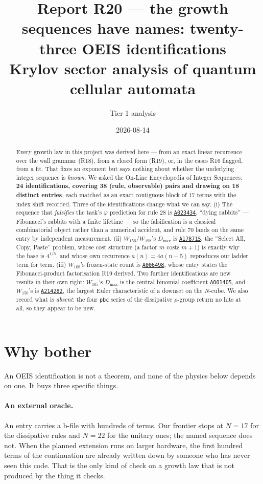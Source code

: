 \documentclass[11pt]{article}
\title{\textbf{Report R20 --- the growth sequences have names:
twenty-three OEIS identifications}\\
\large Krylov sector analysis of quantum cellular automata}
\author{Tier 1 analysis}
\date{2026-08-14}
\newcommand{\rt}[1]{\texttt{#1}}
\newcommand{\oeis}[1]{\href{https://oeis.org/#1}{\texttt{#1}}}
\theoremstyle{plain}
\begin{document}
\maketitle

\begin{abstract}
Every growth law in this project was derived here --- from an exact linear
recurrence over the wall grammar (R18), from a closed form (R19), or, in the
cases R16 flagged, from a fit. That fixes an exponent but says nothing about
whether the underlying integer sequence is \emph{known}. We asked the On-Line
Encyclopedia of Integer Sequences: \textbf{24 identifications, covering 38
(rule, observable) pairs and drawing on 18 distinct entries}, each matched as an
exact contiguous block of $17$ terms with the index shift recorded. Three of the
identifications change what we can say. (i) The sequence that \emph{falsifies}
the task's $\varphi$ prediction for rule 28 is \oeis{A023434}, ``dying
rabbits'' --- Fibonacci's rabbits with a finite lifetime --- so the falsification
is a classical combinatorial object rather than a numerical accident, and rule
70 lands on the same entry by independent measurement. (ii) $W_{156}/W_{198}$'s
$D_{\max}$ is \oeis{A178715}, the ``Select All, Copy, Paste'' problem, whose cost
structure (a factor $m$ costs $m+1$) is exactly why the base is $4^{1/5}$, and
whose own recurrence $a(n)=4a(n-5)$ reproduces our ladder term for term.
(iii) $W_{108}$'s frozen-state count is \oeis{A006498}, whose entry states the
Fibonacci-product factorisation R19 derived. Two further identifications are
new results in their own right: $W_{105}$'s $D_{\max}$ is the central binomial
coefficient \oeis{A001405}, and $W_{150}$'s is \oeis{A214282}, the largest Euler
characteristic of a downset on the $N$-cube. We also record what is
\emph{absent}: the four \rt{pbc} series of the dissipative $\rho$-group return
no hits at all, so they appear to be new.
\end{abstract}

\tableofcontents

\section{Why bother}

An OEIS identification is not a theorem, and none of the physics below depends
on one. It buys three specific things.

\paragraph{An external oracle.} An entry carries a b-file with hundreds of
terms. Our frontier stops at $N=17$ for the dissipative rules and $N=22$ for the
unitary ones; the named sequence does not. When the planned extension runs on
larger hardware, the first hundred terms of the continuation are already
written down by someone who has never seen this code. That is the only kind of
check on a growth law that is not produced by the thing it checks.
\end{document}
